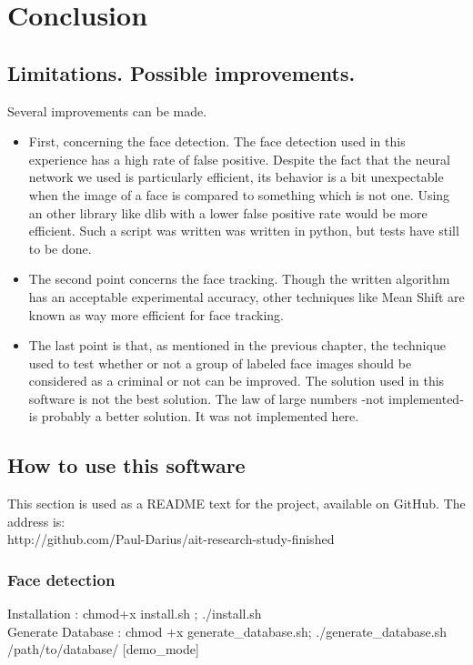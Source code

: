 \setlength{\footskip}{8mm}

\chapter{Conclusion}
\label{ch:conclusion}


\section{Limitations. Possible improvements.}
Several improvements can be made.
\begin{itemize}
\item First, concerning the face detection. The face detection used in this experience has a high rate of false positive. Despite the fact that the neural network we used is particularly efficient, its behavior is a bit unexpectable when the image of a face is compared to something which is not one. Using an other library like dlib with a lower false positive rate would be more efficient. Such a script was written was written in python, but tests have still to be done.
\item The second point concerns the face tracking. Though the written algorithm has an acceptable experimental accuracy, other techniques like Mean Shift are known as way more efficient for face tracking.
\item The last point is that, as mentioned in the previous chapter, the technique used to test whether or not a group of labeled face images should be considered as a criminal or not can be improved. The solution used in this software is not the best solution. The law of large numbers -not implemented- is probably a better solution. It was not implemented here.
\end{itemize}

\section{How to use this software}
This section is used as a README text for the project, available on GitHub. The address is:\\ http://github.com/Paul-Darius/ait-research-study-finished\newpage
\FloatBarrier

\subsection{Face detection}

Installation : chmod+x install.sh ; ./install.sh\\
Generate Database : chmod +x generate\_database.sh; ./generate\_database.sh /path/to/database/ [demo\_mode]\\


